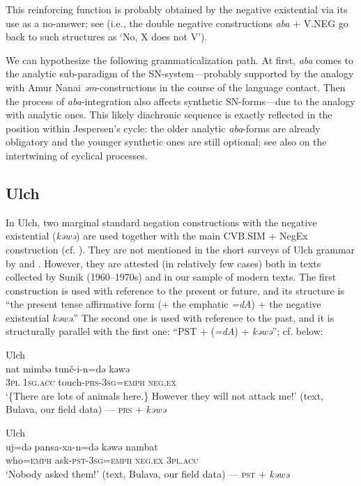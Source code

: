 \documentclass[output=paper]{langscibook}
\begin{document}
This reinforcing function is probably obtained by the negative existential via its use as a no-answer; see  (i.e., the double negative constructions \textit{aba} + V.NEG go back to such structures as ‘No, X does not V’).

We can hypothesize the following grammaticalization path. At first, \textit{aba} comes to the analytic sub-paradigm of the SN-system—probably supported by the analogy with Amur Nanai \textit{əm}-constructions in the course of the language contact. Then the process of \textit{aba}-integration also affects synthetic SN-forms—due to the analogy with analytic ones. This likely diachronic sequence is exactly reflected in the position within Jespersen’s cycle: the older analytic \textit{aba}-forms are already obligatory and the younger synthetic ones are still optional; see also  on the intertwining of cyclical processes.

\subsection{Ulch}\label{sec:T6.2}

In Ulch, two marginal standard negation constructions with the negative existential (\textit{kəwə}) are used together with the main CVB.SIM + NegEx construction (cf. ). They are not mentioned in the short surveys of Ulch grammar by \citet{petrova1936a} and \citet{sunik1985a}. However, they are attested (in relatively few cases) both in texts collected by Sunik (1960–1970s) and in our sample of modern texts. The first construction is used with reference to the present or future, and its structure is “the present tense affirmative form (+ the emphatic \textit{=dA}) + the negative existential \textit{kəwə}.” The second one is used with reference to the past, and it is structurally parallel with the first one: “PST + (\textit{=dA}) + \textit{kəwə}”; cf. below:

\ea Ulch \label{ex:T28}\\
	\gll nat	mimbə	tunč-i-n=də	kəwə\\
	\textsc{3pl}	\textsc{1sg.acc}	touch-\textsc{prs-3sg=emph}	\textsc{neg.ex}\\
	\glt `\{There are lots of animals here.\} However they will not attack me!' (text, Bulava, our field data) — \textsc{prs} + \textit{kəwə}
\z

\ea Ulch \label{ex:T29}\\
	\gll uj=də	pansa-xa-n=də	kəwə	nambat\\
	who=\textsc{emph}	ask-\textsc{pst-3sg=emph}	\textsc{neg.ex}	\textsc{3pl.acc}\\
	\glt `Nobody asked them!' (text, Bulava, our field data) — \textsc{pst} + \textit{kəwə}
\z
\end{document}
